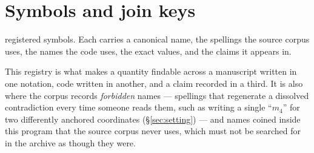 \section{Symbols and join keys}
\label{app:symbols}

\SymbolCount{} registered symbols. Each carries a canonical name, the
spellings the source corpus uses, the names the code uses, the exact
values, and the claims it appears in.

This registry is what makes a quantity findable across a manuscript
written in one notation, code written in another, and a claim recorded
in a third. It is also where the corpus records \emph{forbidden} names
--- spellings that regenerate a dissolved contradiction every time
someone reads them, such as writing a single ``$m_4$'' for two
differently anchored coordinates (\S\ref{sec:setting}) --- and names
coined inside this program that the source corpus never uses, which
must not be searched for in the archive as though they were.


